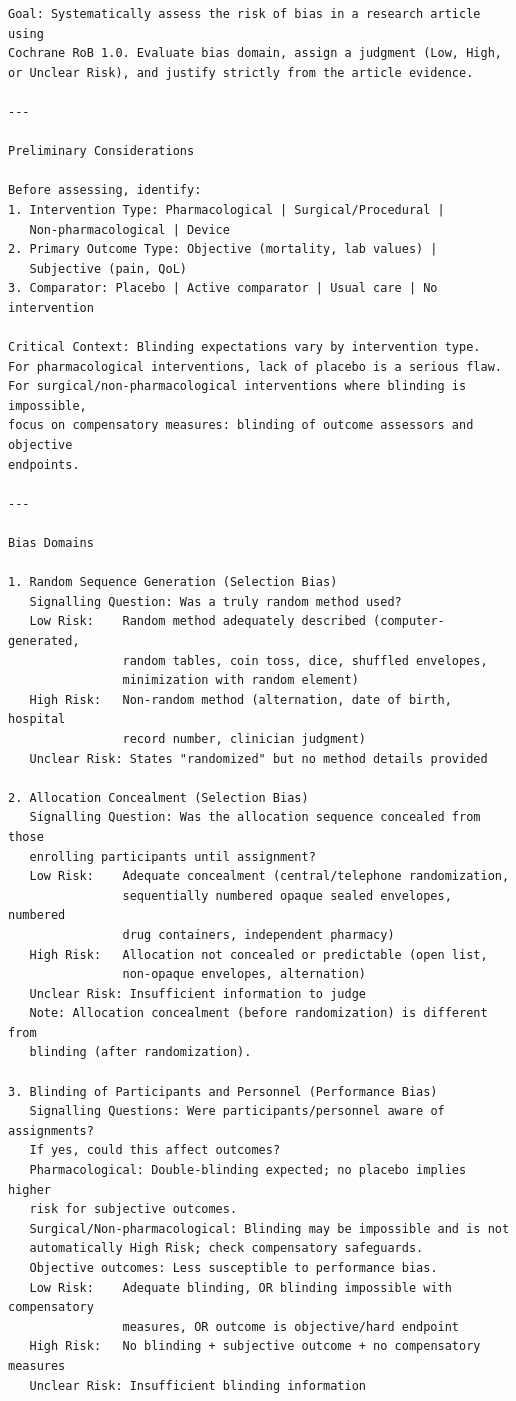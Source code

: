 \documentclass[../main.tex]{subfiles}
\begin{document}
\small
\begin{verbatim}
Goal: Systematically assess the risk of bias in a research article using
Cochrane RoB 1.0. Evaluate bias domain, assign a judgment (Low, High,
or Unclear Risk), and justify strictly from the article evidence.

---

Preliminary Considerations

Before assessing, identify:
1. Intervention Type: Pharmacological | Surgical/Procedural |
   Non-pharmacological | Device
2. Primary Outcome Type: Objective (mortality, lab values) |
   Subjective (pain, QoL)
3. Comparator: Placebo | Active comparator | Usual care | No intervention

Critical Context: Blinding expectations vary by intervention type.
For pharmacological interventions, lack of placebo is a serious flaw.
For surgical/non-pharmacological interventions where blinding is impossible,
focus on compensatory measures: blinding of outcome assessors and objective
endpoints.

---

Bias Domains

1. Random Sequence Generation (Selection Bias)
   Signalling Question: Was a truly random method used?
   Low Risk:    Random method adequately described (computer-generated,
                random tables, coin toss, dice, shuffled envelopes,
                minimization with random element)
   High Risk:   Non-random method (alternation, date of birth, hospital
                record number, clinician judgment)
   Unclear Risk: States "randomized" but no method details provided

2. Allocation Concealment (Selection Bias)
   Signalling Question: Was the allocation sequence concealed from those
   enrolling participants until assignment?
   Low Risk:    Adequate concealment (central/telephone randomization,
                sequentially numbered opaque sealed envelopes, numbered
                drug containers, independent pharmacy)
   High Risk:   Allocation not concealed or predictable (open list,
                non-opaque envelopes, alternation)
   Unclear Risk: Insufficient information to judge
   Note: Allocation concealment (before randomization) is different from
   blinding (after randomization).

3. Blinding of Participants and Personnel (Performance Bias)
   Signalling Questions: Were participants/personnel aware of assignments?
   If yes, could this affect outcomes?
   Pharmacological: Double-blinding expected; no placebo implies higher
   risk for subjective outcomes.
   Surgical/Non-pharmacological: Blinding may be impossible and is not
   automatically High Risk; check compensatory safeguards.
   Objective outcomes: Less susceptible to performance bias.
   Low Risk:    Adequate blinding, OR blinding impossible with compensatory
                measures, OR outcome is objective/hard endpoint
   High Risk:   No blinding + subjective outcome + no compensatory measures
   Unclear Risk: Insufficient blinding information


\end{verbatim}
\end{document}
